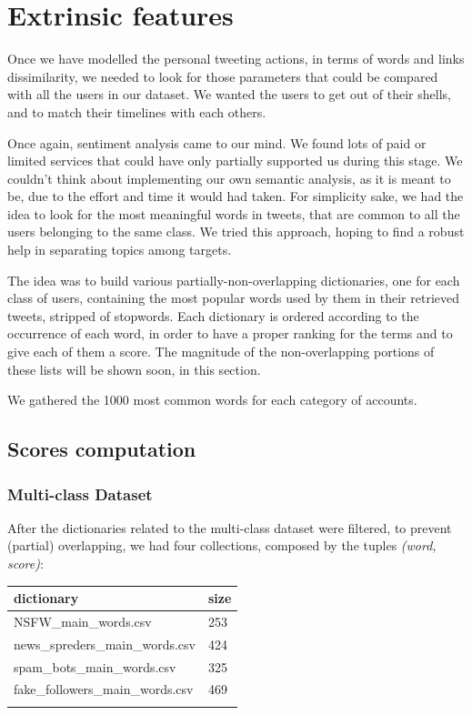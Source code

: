 \section{Extrinsic features}
Once we have modelled the personal tweeting actions, in terms of words and links dissimilarity, we needed to look for those parameters that could be compared with all the users in our dataset.
We wanted the users to get out of their shells, and to match their timelines with each others.

Once again, sentiment analysis came to our mind. We found lots of paid or limited services that could have only partially supported us during this stage.
We couldn't think about implementing our own semantic analysis, as it is meant to be, due to the effort and time it would had taken.
For simplicity sake, we had the idea to look for the most meaningful words in tweets, that are common to all the users belonging to the same class.
We tried this approach, hoping to find a robust help in separating topics among targets.

The idea was to build various partially-non-overlapping dictionaries, one for each class of users, containing the most popular words used by them in their retrieved tweets, stripped of stopwords. Each dictionary is ordered according to the occurrence of each word, in order to have a proper ranking for the terms and to give each of them a score.
The magnitude of the non-overlapping portions of these lists will be shown soon, in this section.

We gathered the 1000 most common words for each category of accounts.

\subsection{Scores computation}

\subsubsection{Multi-class Dataset}
After the dictionaries related to the multi-class dataset were filtered, to prevent (partial) overlapping, we had four collections, composed by the tuples \textit{(word, score)}:
\small
\begin{center}
	\begin{tabular}{ll}
		\\dictionary&size\\
		\hline\hline
		NSFW\_main\_words.csv&253\\
		news\_spreders\_main\_words.csv&424\\
		spam\_bots\_main\_words.csv&325\\
		fake\_followers\_main\_words.csv&469\\\hline\\
	\end{tabular}
\end{center}
\normalsize

